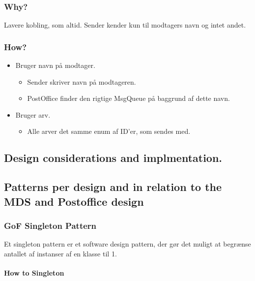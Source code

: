 \subsubsection{Why?}
Lavere kobling, som altid. Sender kender kun til modtagers navn og intet andet.

\subsubsection{How?}

\begin{itemize}
	\item Bruger navn på modtager.
	\begin{itemize}
		\item Sender skriver navn på modtageren.
		\item PostOffice finder den rigtige MsgQueue på baggrund af dette navn.
	\end{itemize}
	\item Bruger arv.
	\begin{itemize}
		\item Alle arver det samme enum af ID'er, som sendes med. 
	\end{itemize}
\end{itemize}


\subsection{Design considerations and implmentation.}

\subsection{Patterns per design and in relation to the MDS and Postoffice design}

\subsubsection{GoF Singleton Pattern}

Et singleton pattern er et software design pattern, der gør det muligt at begrænse antallet af instanser af en klasse til 1.

\paragraph{How to Singleton}


